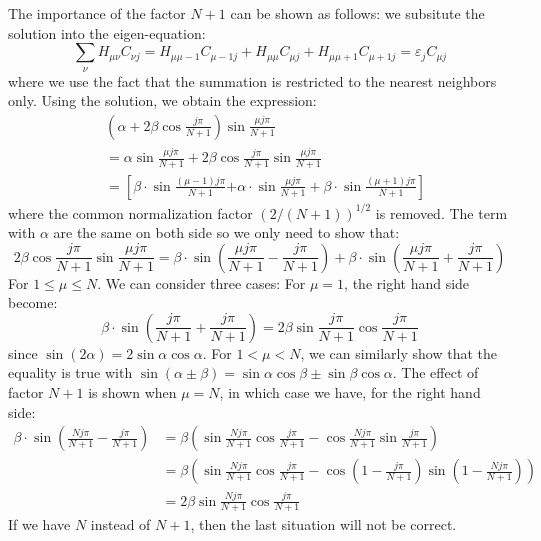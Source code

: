 \documentclass{article}
\begin{document}
The importance of the factor $N+1$ can be shown as follows: we subsitute the solution into the 
eigen-equation:
\begin{equation}
    \sum_{\nu} H_{\mu\nu} C_{\nu j} = H_{\mu\mu-1} C_{\mu-1 j} + H_{\mu\mu} C_{\mu j} + H_{\mu\mu+1} C_{\mu+1 j} = \varepsilon_j C_{\mu j}
\end{equation}
where we use the fact that the summation is restricted to the nearest neighbors only. Using the 
solution, we obtain the expression:
\begin{align}
    &\left(\alpha + 2 \beta \cos\frac{j\pi}{N+1}\right) \sin\frac{\mu j\pi}{N+1} \\
    &= \alpha \sin\frac{\mu j\pi}{N+1} + 2 \beta \cos\frac{j\pi}{N+1} \sin\frac{\mu j\pi}{N+1} \\ 
    &= \left[\beta\cdot \sin\frac{(\mu-1) j\pi}{N+1}  \right. 
     \left. + \alpha\cdot\sin\frac{\mu j\pi}{N+1}  + \beta \cdot \sin \frac{(\mu+1) j\pi}{N+1}\right] 
\end{align} 
where the common normalization factor $(2/(N+1))^{1/2}$ is removed. The term with $\alpha$ are the same on both side 
so we only need to show that:
\begin{equation}
    2 \beta \cos\frac{j\pi}{N+1} \sin\frac{\mu j\pi}{N+1} 
    = \beta\cdot \sin\left( \frac{\mu j\pi}{N+1} - \frac{j\pi}{N+1} \right) 
    + \beta\cdot \sin\left( \frac{\mu j\pi}{N+1} + \frac{j\pi}{N+1} \right)
\end{equation}
For $1 \leq \mu \leq N$. We can consider three cases: 
For $\mu = 1$, the right hand side become:
\begin{equation}
    \beta\cdot \sin\left( \frac{j\pi}{N+1} + \frac{j\pi}{N+1} \right) 
    = 2 \beta \sin \frac{j\pi}{N+1} \cos \frac{j\pi}{N+1} 
\end{equation}
since $\sin(2\alpha) = 2\sin\alpha\cos\alpha$. 
For $1 < \mu < N$, we can similarly show that the equality is true with 
$\sin(\alpha \pm \beta) = \sin\alpha\cos\beta \pm \sin\beta\cos\alpha$. 
The effect of factor $N+1$ is shown when $\mu = N$, in which case we have, for the right hand side:
\begin{align}
    \beta\cdot \sin\left( \frac{N j\pi}{N+1} - \frac{j\pi}{N+1} \right) 
    &= \beta \left( \sin\frac{N j\pi}{N+1}\cos\frac{j\pi}{N+1} - \cos\frac{N j\pi}{N+1}\sin\frac{j\pi}{N+1}  \right) \\ 
    &= \beta \left( \sin\frac{N j\pi}{N+1}\cos\frac{j\pi}{N+1} - \cos\left(1 - \frac{j\pi}{N+1}\right)\sin\left(1 - \frac{Nj\pi}{N+1}\right)  \right) \\ 
    &=2 \beta \sin\frac{N j\pi}{N+1}\cos\frac{j\pi}{N+1}
\end{align}
If we have $N$ instead of $N+1$, then the last situation will not be correct.
\end{document}
